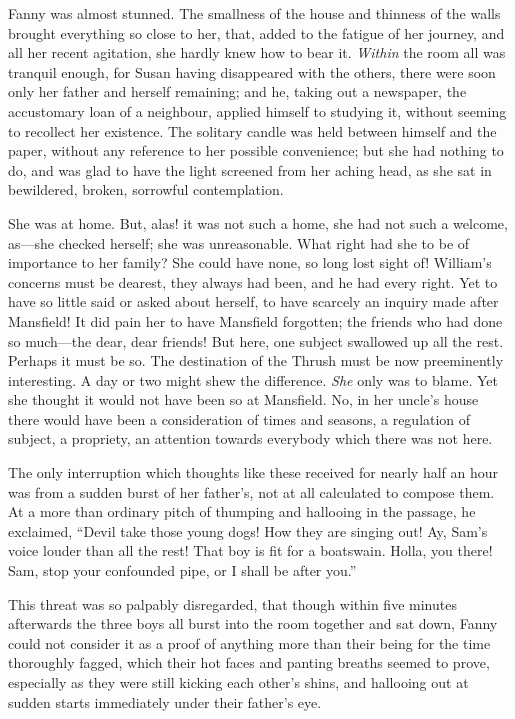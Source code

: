 \documentclass{article}
\begin{document}
Fanny was almost stunned.  The smallness of the house
and thinness of the walls brought everything so close
to her, that, added to the fatigue of her journey, and all
her recent agitation, she hardly knew how to bear it.
\emph{Within} the room all was tranquil enough, for Susan having
disappeared with the others, there were soon only her father
and herself remaining; and he, taking out a newspaper,
the accustomary loan of a neighbour, applied himself to
studying it, without seeming to recollect her existence.
The solitary candle was held between himself and the paper,
without any reference to her possible convenience;
but she had nothing to do, and was glad to have the light
screened from her aching head, as she sat in bewildered,
broken, sorrowful contemplation.

She was at home.  But, alas! it was not such a home,
she had not such a welcome, as---she checked herself;
she was unreasonable.  What right had she to be of importance
to her family?  She could have none, so long lost sight of!
William's concerns must be dearest, they always had been,
and he had every right.  Yet to have so little said
or asked about herself, to have scarcely an inquiry made
after Mansfield!  It did pain her to have Mansfield forgotten;
the friends who had done so much---the dear, dear friends!
But here, one subject swallowed up all the rest.
Perhaps it must be so.  The destination of the Thrush
must be now preeminently interesting.  A day or two
might shew the difference.  \emph{She} only was to blame.
Yet she thought it would not have been so at Mansfield.
No, in her uncle's house there would have been a
consideration of times and seasons, a regulation of subject,
a propriety, an attention towards everybody which there
was not here.

The only interruption which thoughts like these received
for nearly half an hour was from a sudden burst of her
father's, not at all calculated to compose them.  At a more
than ordinary pitch of thumping and hallooing in the passage,
he exclaimed, ``Devil take those young dogs!  How they are
singing out!  Ay, Sam's voice louder than all the rest!
That boy is fit for a boatswain.  Holla, you there!
Sam, stop your confounded pipe, or I shall be after you.''

This threat was so palpably disregarded, that though
within five minutes afterwards the three boys all burst
into the room together and sat down, Fanny could not
consider it as a proof of anything more than their being
for the time thoroughly fagged, which their hot faces
and panting breaths seemed to prove, especially as they
were still kicking each other's shins, and hallooing
out at sudden starts immediately under their father's eye.
\end{document}
